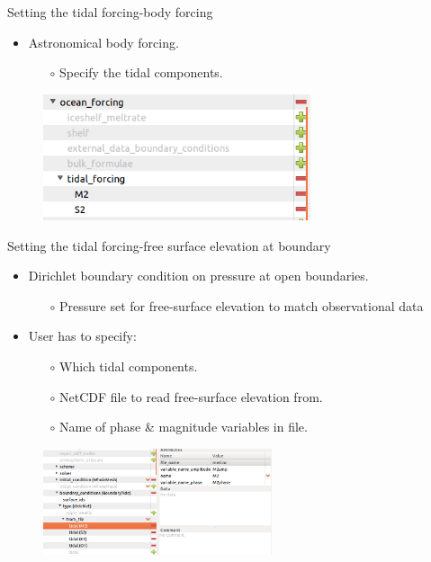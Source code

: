 \documentclass[t]{beamer}
\begin{document}
\begin{frame}{Setting the tidal forcing-body forcing}
  \begin{itemize}
  \item Astronomical body forcing.
    \begin{itemize}
       \item[$\circ$] Specify the tidal components.
    \end{itemize}
  \end{itemize}
  \begin{figure}[htbp!]
    \centering
    \includegraphics[width=0.7\textwidth]{figures/body_forcing}
  \end{figure}
\end{frame}

\begin{frame}{Setting the tidal forcing-free surface elevation at boundary}
  \begin{itemize}
  \item Dirichlet boundary condition on pressure at open boundaries.
    \begin{itemize}
       \item[$\circ$] Pressure set for free-surface elevation to match observational data
    \end{itemize}
  \item User has to specify:
    \begin{itemize}
       \item[$\circ$] Which tidal components.
       \item[$\circ$] NetCDF file to read free-surface elevation from.
       \item[$\circ$] Name of phase \& magnitude variables in file.
    \end{itemize}
  \end{itemize}
  \begin{figure}[htbp!]
    \centering
    \includegraphics[width=0.6\textwidth]{figures/diamond_freeSurf_pre_Bc.png}
  \end{figure}
\end{frame}
\end{document}
